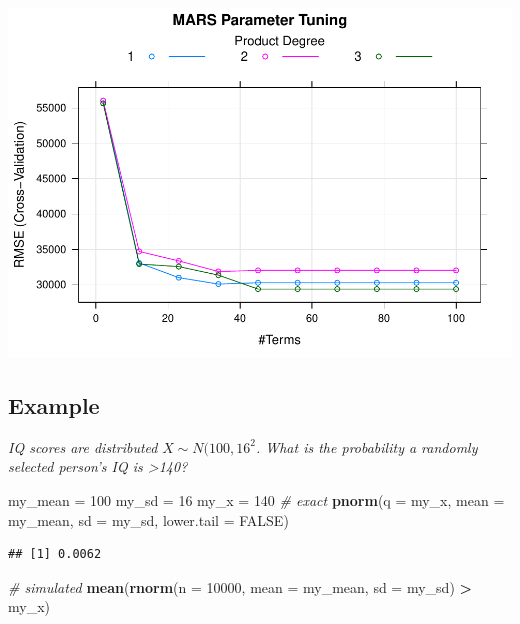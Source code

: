 \documentclass[
]{book}
\newenvironment{Shaded}{\begin{snugshade}}{\end{snugshade}}
\newcommand{\CommentTok}[1]{\textcolor[rgb]{0.56,0.35,0.01}{\textit{#1}}}
\newcommand{\DataTypeTok}[1]{\textcolor[rgb]{0.13,0.29,0.53}{#1}}
\newcommand{\DecValTok}[1]{\textcolor[rgb]{0.00,0.00,0.81}{#1}}
\newcommand{\KeywordTok}[1]{\textcolor[rgb]{0.13,0.29,0.53}{\textbf{#1}}}
\newcommand{\NormalTok}[1]{#1}
\newcommand{\OperatorTok}[1]{\textcolor[rgb]{0.81,0.36,0.00}{\textbf{#1}}}
\newcommand{\OtherTok}[1]{\textcolor[rgb]{0.56,0.35,0.01}{#1}}
\newcommand{\StringTok}[1]{\textcolor[rgb]{0.31,0.60,0.02}{#1}}
\begin{document}
\includegraphics{data-sci_files/figure-latex/unnamed-chunk-21-1.pdf}

\hypertarget{example-11}{%
\subsection{Example}\label{example-11}}

\emph{IQ scores are distributed }\(X \sim N(100, 16^2\)\emph{. What is the probability a randomly selected person's IQ is \textgreater140?}

\begin{Shaded}
\begin{Highlighting}[]
\NormalTok{my_mean =}\StringTok{ }\DecValTok{100}
\NormalTok{my_sd =}\StringTok{ }\DecValTok{16}
\NormalTok{my_x =}\StringTok{ }\DecValTok{140}
\CommentTok{# exact}
\KeywordTok{pnorm}\NormalTok{(}\DataTypeTok{q =}\NormalTok{ my_x, }\DataTypeTok{mean =}\NormalTok{ my_mean, }\DataTypeTok{sd =}\NormalTok{ my_sd, }\DataTypeTok{lower.tail =} \OtherTok{FALSE}\NormalTok{)}
\end{Highlighting}
\end{Shaded}

\begin{verbatim}
## [1] 0.0062
\end{verbatim}

\begin{Shaded}
\begin{Highlighting}[]
\CommentTok{# simulated}
\KeywordTok{mean}\NormalTok{(}\KeywordTok{rnorm}\NormalTok{(}\DataTypeTok{n =} \DecValTok{10000}\NormalTok{, }\DataTypeTok{mean =}\NormalTok{ my_mean, }\DataTypeTok{sd =}\NormalTok{ my_sd) }\OperatorTok{>}\StringTok{ }\NormalTok{my_x)}
\end{Highlighting}
\end{Shaded}
\end{document}
